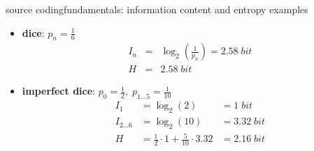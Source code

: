 	\begin{frame}{source coding}{fundamentals: information content and entropy examples}
		\begin{itemize}
			\item	\textbf{dice}: $p_n = \frac{1}{6}$
			\begin{eqnarray*}
				I_n &=& \log_2\left(\frac{1}{p_n}\right)  = 2.58\; bit\\
				H &=& 2.58\; bit %
			\end{eqnarray*}
			\pause
			\item	\textbf{imperfect dice}: $p_0 = \frac{1}{2},\; p_{1\ldots 5} = \frac{1}{10}$
			\pause
			\begin{eqnarray*}
				I_1 &=  \log_2\left(2\right)  &= 1\; bit \\
				I_{2\ldots 6} &= \log_2\left(10\right)  &= 3.32\; bit \\
				H &= \frac{1}{2}\cdot 1 + \frac{5}{10}\cdot 3.32 &= 2.16\; bit %
			\end{eqnarray*}
		\end{itemize}
	\end{frame}

